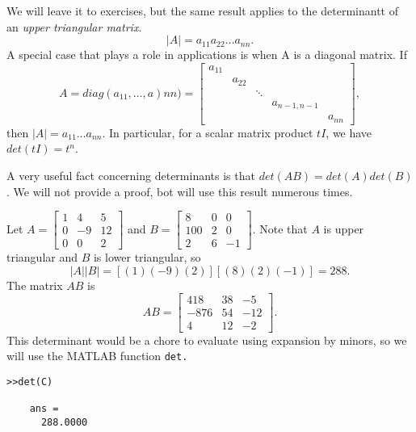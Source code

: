 \documentclass[../main.tex]{subfiles}
\begin{document}
We will leave it to exercises, but the same result applies to the determinantt of an \emph{upper triangular matrix}.\[|A| = a_{11}a_{22} \hdots a_{nn}.\]
A special case that plays a role in applications is when A is a diagonal matrix. If
\begin{equation*}
  A = diag(a_{11}, \hdots, a){nn}) = 
  \begin{bmatrix}
    a_{11} &\\
    & a_{22} &\\
    & & \ddots &\\
    & & & a_{n-1,n-1} &\\
    & & & & a_{nn}
  \end{bmatrix},
\end{equation*}
then \(|A| = a_{11} \hdots a_{nn}\). In particular, for a scalar matrix product \(tI\), we have \(det(tI) = t^n\).
\begin{remark}
  A very useful fact concerning determinants is that \(det(AB) = det(A)det(B)\). We will not provide a proof, bot will use this result numerous times.
\end{remark}
\begin{example}
  Let \(A = 
    \begin{bmatrix}
	  1 & 4 & 5\\
	  0 & -9 & 12\\
	  0 & 0 & 2
    \end{bmatrix}
  \) and \(B=
    \begin{bmatrix}
	  8 & 0 & 0\\
	  100 & 2 & 0\\
	  2 & 6 & -1
    \end{bmatrix}
  \). Note that \(A\) is upper triangular and \(B\) is lower triangular, so
  \[|A||B| = [(1)(-9)(2)][(8)(2)(-1)] = 288.\]
  The matrix \(AB\) is 
  \begin{equation*}
    AB =     
    \begin{bmatrix}
      418 & 38 & -5\\
      -876 & 54 & -12\\
      4 & 12 & -2
    \end{bmatrix}.
  \end{equation*}
  This determinant would be a chore to evaluate using expansion by minors, so we will use the MATLAB function \texttt{det.}
  \begin{lstlisting}[numbers=none,frame=none]
    >>det(C)
    
    ans = 
      288.0000
  \end{lstlisting}
\end{example}
\end{document}
